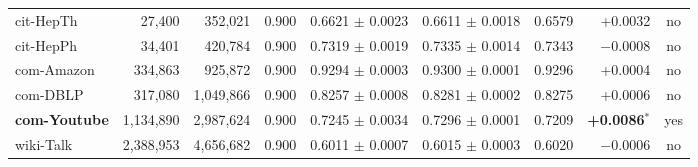 \begin{table}[t]
\begin{tabular}{lrrrrrrrc}
cit-HepTh & 27,400 & 352,021 & 0.900 & 0.6621 $\pm$ 0.0023 & 0.6611 $\pm$ 0.0018 & 0.6579 & +0.0032 & no \\
cit-HepPh & 34,401 & 420,784 & 0.900 & 0.7319 $\pm$ 0.0019 & 0.7335 $\pm$ 0.0014 & 0.7343 & $-$0.0008 & no \\
com-Amazon & 334,863 & 925,872 & 0.900 & 0.9294 $\pm$ 0.0003 & 0.9300 $\pm$ 0.0001 & 0.9296 & +0.0004 & no \\
com-DBLP & 317,080 & 1,049,866 & 0.900 & 0.8257 $\pm$ 0.0008 & 0.8281 $\pm$ 0.0002 & 0.8275 & +0.0006 & no \\
\textbf{com-Youtube} & 1,134,890 & 2,987,624 & 0.900 & 0.7245 $\pm$ 0.0034 & 0.7296 $\pm$ 0.0001 & 0.7209 & \textbf{+0.0086}$^{\ast}$ & yes \\
wiki-Talk & 2,388,953 & 4,656,682 & 0.900 & 0.6011 $\pm$ 0.0007 & 0.6015 $\pm$ 0.0003 & 0.6020 & $-$0.0006 & no \\
\bottomrule
\end{tabular}
\end{table}
